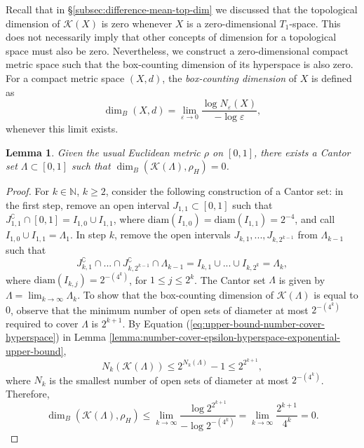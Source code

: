 \documentclass[sn-mathphys-num]{sn-jnl}%
\theoremstyle{thmstyleone}%
\newtheorem{lemma}{Lemma}
\theoremstyle{thmstyletwo}%
\theoremstyle{thmstylethree}%
\newcommand*\hyp[1]{\mathcal{#1}}
\begin{document}
Recall that in \S\ref{subsec:difference-mean-top-dim} we discussed that the topological dimension of $\hyp{K}(X)$ is zero whenever $X$ is a zero-dimensional $T_1$-space. This does not necessarily imply that other concepts of dimension for a topological space must also be zero. Nevertheless, we construct a zero-dimensional compact metric space such that the box-counting dimension of its hyperspace is also zero. For a compact metric space $(X, d)$, the \emph{box-counting dimension} of $X$ is defined as
\begin{equation*}
    \dim_B(X, d) = \lim_{\varepsilon \to 0} \frac{\log N_\varepsilon(X)}{-\log \varepsilon},
\end{equation*}
whenever this limit exists.\\

\begin{lemma}\label{lemma:cantor-set-hyperspace-zero-box-dimension}
    Given the usual Euclidean metric $\rho$ on $[0, 1]$, there exists a Cantor set $\Lambda \subset [0, 1]$ such that $\dim_B(\hyp{K}(\Lambda), \rho_H) = 0$.
\end{lemma}
\begin{proof}
    For $k \in \mathbb{N}$, $k \geq 2$, consider the following construction of a Cantor set: in the first step, remove an open interval $J_{1, 1} \subset [0, 1]$ such that $J_{1, 1}^\complement \cap [0, 1] = I_{1, 0} \cup I_{1, 1}$, where $\text{diam}(I_{1, 0}) = \text{diam}(I_{1, 1}) = 2^{-4}$, and call $I_{1, 0} \cup I_{1, 1} = \Lambda_1$. In step $k$, remove the open intervals $J_{k, 1}, ..., J_{k, 2^{k - 1}}$ from $\Lambda_{k - 1}$ such that
    \begin{equation*}
        J_{k, 1}^\complement \cap ... \cap J_{k, 2^{k - 1}}^\complement \cap \Lambda_{k - 1} = I_{k, 1} \cup ... \cup I_{k, 2^k} = \Lambda_k,
    \end{equation*}
    where $\text{diam}(I_{k, j}) = 2^{-(4^k)}$, for $1 \leq j \leq 2^k$. The Cantor set $\Lambda$ is given by $\Lambda = \lim_{k \to \infty} \Lambda_k$. To show that the box-counting dimension of $\hyp{K}(\Lambda)$ is equal to $0$, observe that the minimum number of open sets of diameter at most $2^{-(4^k)}$ required to cover $\Lambda$ is $2^{k+1}$. By Equation (\ref{eq:upper-bound-number-cover-hyperspace}) in Lemma \ref{lemma:number-cover-epsilon-hyperspace-exponential-upper-bound}, 
    \begin{equation*}
        N_k(\hyp{K}(\Lambda)) \leq 2^{N_k(\Lambda)} - 1 \leq 2^{2^{k + 1}},
    \end{equation*}
    where $N_k$ is the smallest number of open sets of diameter at most $2^{-(4^k)}$. Therefore,
    \begin{equation*}
        \dim_B(\hyp{K}(\Lambda), \rho_H) \leq \lim_{k \to \infty} \frac{\log 2^{2^{k + 1}}}{-\log 2^{-(4^k)}} = \lim_{k \to \infty} \frac{2^{k + 1}}{4^k} = 0. 
    \end{equation*}
\end{proof}
\end{document}
